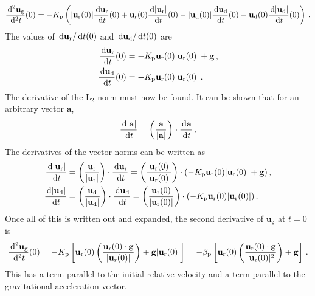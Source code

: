 \begin{align}
    \frac{\,\mathrm{d}^2 \mathbf{u}_\text{g}}{\,\mathrm{d}^2 t}(0) = -K_{\rm p} \left(|\mathbf{u}_\text{r}(0)| \frac{\,\mathrm{d} \mathbf{u}_\text{r}}{\,\mathrm{d} t}(0) + \mathbf{u}_\text{r}(0) \frac{\,\mathrm{d} |\mathbf{u}_\text{r}|}{\,\mathrm{d} t}(0) - |\mathbf{u}_\text{d}(0)| \frac{\,\mathrm{d} \mathbf{u}_\text{d}}{\,\mathrm{d} t}(0) - \mathbf{u}_\text{d}(0) \frac{\,\mathrm{d} |\mathbf{u}_\text{d}|}{\,\mathrm{d} t}(0)\right) \,.
\end{align}
The values of $\,\mathrm{d} \mathbf{u}_\text{r} / \,\mathrm{d} t(0)$ and $\,\mathrm{d} \mathbf{u}_\text{d} / \,\mathrm{d} t(0)$ are
\begin{align*}
    \frac{\,\mathrm{d} \mathbf{u}_\text{r}}{\,\mathrm{d} t}(0) &= -K_{\rm p} \mathbf{u}_{\text{r}}(0) |\mathbf{u}_{\text{r}}(0)| + \mathbf{g} \,, \\
    \frac{\,\mathrm{d} \mathbf{u}_\text{d}}{\,\mathrm{d} t}(0) &= -K_{\rm p} \mathbf{u}_{\text{r}}(0) |\mathbf{u}_{\text{r}}(0)| \,.
\end{align*}
The derivative of the L$_2$ norm must now be found. It can be shown that for an arbitrary vector $\mathbf{a}$,
\begin{align*}
    \frac{\,\mathrm{d} |\mathbf{a}|}{\,\mathrm{d} t} = \left(\frac{\mathbf{a}}{|\mathbf{a}|}\right) \cdot \frac{\,\mathrm{d} \mathbf{a}}{\,\mathrm{d} t} \,.
\end{align*}
The derivatives of the vector norms can be written as
\begin{align}
    \frac{\,\mathrm{d} |\mathbf{u}_\text{r}|}{\,\mathrm{d} t} &= \left(\frac{\mathbf{u}_\text{r}}{|\mathbf{u}_\text{r}|}\right) \cdot \frac{\,\mathrm{d} \mathbf{u}_\text{r}}{\,\mathrm{d} t} = \left(\frac{\mathbf{u}_{\text{r}}(0)}{|\mathbf{u}_{\text{r}}(0)|}\right) \cdot (-K_{\rm p} \mathbf{u}_{\text{r}}(0) |\mathbf{u}_{\text{r}}(0)| + \mathbf{g}) \,,  \\
    \frac{\,\mathrm{d} |\mathbf{u}_\text{d}|}{\,\mathrm{d} t} &= \left(\frac{\mathbf{u}_\text{d}}{|\mathbf{u}_\text{d}|}\right) \cdot \frac{\,\mathrm{d} \mathbf{u}_\text{d}}{\,\mathrm{d} t} = \left(\frac{\mathbf{u}_{\text{r}}(0)}{|\mathbf{u}_{\text{r}}(0)|}\right) \cdot (-K_{\rm p} \mathbf{u}_{\text{r}}(0) |\mathbf{u}_{\text{r}}(0)|) \,.
\end{align}
Once all of this is written out and expanded, the second derivative of $\mathbf{u}_\text{g}$ at $t = 0$ is
\begin{align}
    \frac{\,\mathrm{d}^2 \mathbf{u}_\text{g}}{\,\mathrm{d}^2 t}(0) = -K_{\rm p} \left[\mathbf{u}_{\text{r}}(0) \left(\frac{\mathbf{u}_{\text{r}}(0) \cdot \mathbf{g}}{|\mathbf{u}_{\text{r}}(0)|}\right) + \mathbf{g} |\mathbf{u}_{\text{r}}(0)|\right] = - \beta_{\rm p} \left[\mathbf{u}_{\text{r}}(0) \left(\frac{\mathbf{u}_{\text{r}}(0) \cdot \mathbf{g}}{|\mathbf{u}_{\text{r}}(0)|^2}\right) + \mathbf{g}\right] \,.
\end{align}
This has a term parallel to the initial relative velocity and a term parallel to the gravitational acceleration vector.

